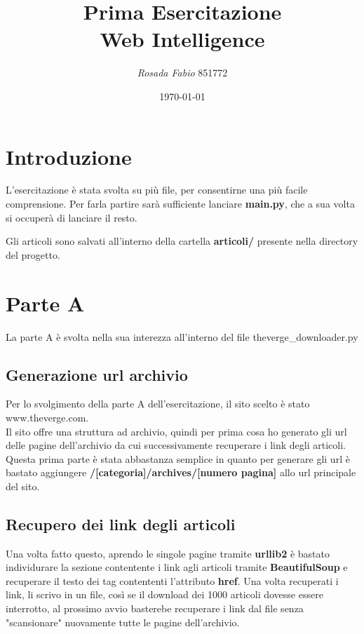 \documentclass{article}
\title{\textbf{Prima Esercitazione\\Web Intelligence}}
\date{\today}
\author{\textit{Rosada Fabio} 851772\\}
\begin{document}
\maketitle
\vfill
\newpage

\tableofcontents
{}

\section{Introduzione}
L'esercitazione è stata svolta su più file, per consentirne una più facile comprensione.
Per farla partire sarà sufficiente lanciare \textbf{main.py}, che a sua volta si occuperà di lanciare il resto.

Gli articoli sono salvati all'interno della cartella \textbf{articoli/} presente nella directory del progetto.

\section{Parte A}
La parte A è svolta nella sua interezza all'interno del file theverge\_downloader.py
\subsection{Generazione url archivio}
Per lo svolgimento della parte A dell'esercitazione, il sito scelto è stato www.theverge.com.\\Il sito offre una struttura ad archivio, quindi per prima cosa ho generato gli url delle pagine dell'archivio da cui successivamente recuperare i link degli articoli. Questa prima parte è stata abbastanza semplice in quanto per generare gli url è bastato aggiungere \textbf{/[categoria]/archives/[numero pagina]} allo url principale del sito.
\subsection{Recupero dei link degli articoli}Una volta fatto questo, aprendo le singole pagine tramite \textbf{urllib2} è bastato individurare la sezione contentente i link agli articoli tramite \textbf{BeautifulSoup} e recuperare il testo dei tag contententi l'attributo \textbf{href}. Una volta recuperati i link, li scrivo in un file, così se il download dei 1000 articoli dovesse essere interrotto, al prossimo avvio basterebe recuperare i link dal file senza "scansionare" nuovamente tutte le pagine dell'archivio.
\end{document}
